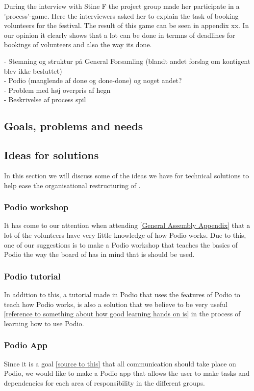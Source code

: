 During the interview with Stine F the project group made her participate in a 'process'-game. Here the interviewers asked her to explain the task of booking volunteers for the festival. The result of this game can be seen in appendix xx. In our opinion it clearly shows that a lot can be done in termns of deadlines for bookings of volunteers and also the way its done.

- Stemning og struktur på General Forsamling (blandt andet forslag om kontigent blev ikke besluttet)\\
- Podio (manglende af done og done-done) og noget andet?\\
- Problem med høj overpris af hegn\\
- Beskrivelse af process spil

\subsection{Goals, problems and needs}


\subsection{Ideas for solutions}
In this section we will discuss some of the ideas we have for technical
solutions to help ease the organisational restructuring of \mil.

\subsubsection{Podio workshop}
It has come to our attention when attending \ref{General Assembly Appendix} that
a lot of the volunteers have very little knowledge of how Podio works. Due to
this, one of our suggestions is to make a Podio workshop that teaches the basics
of Podio the way the board of \mil has in mind that is should be used.

\subsubsection{Podio tutorial}
In addition to this, a tutorial made in Podio that uses the features of Podio to
teach how Podio works, is also a solution that we believe to be very useful
\ref{reference to something about how good learning hands on is} in the process
of learning how to use Podio.

\subsubsection{Podio App}
Since it is a goal \ref{source to this} that all communication should take place
on Podio, we would like to make a Podio app that allows the user to make tasks
and dependencies for each area of responsibility in the different groups.

